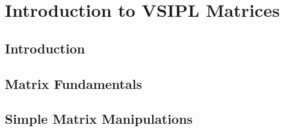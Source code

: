 \chapter{Introduction to VSIPL Matrices}
\section*{Introduction}
\section*{Matrix Fundamentals}
\section*{Simple Matrix Manipulations}
